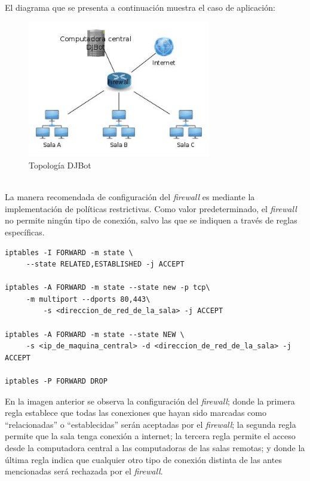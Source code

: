 \documentclass[a4paper,12pt]{article}
\begin{document}
El diagrama que se presenta a continuación muestra el caso de aplicación:\\
\newpage

\begin{figure}[htb]
\centering
\includegraphics[width=8cm]{./img/djbot-topologia.jpg}
\caption{Topología DJBot}
\end{figure}\\


La manera recomendada de configuración del \emph{firewall} es mediante la implementación de políticas restrictivas. Como valor predeterminado, el \emph{firewall} no permite ningún tipo de conexión, salvo las que se indiquen a través de reglas específicas.\\

\begin{verbatim}
iptables -I FORWARD -m state \
	 --state RELATED,ESTABLISHED -j ACCEPT

iptables -A FORWARD -m state --state new -p tcp\
	 -m multiport --dports 80,443\
         -s <direccion_de_red_de_la_sala> -j ACCEPT

iptables -A FORWARD -m state --state NEW \
	 -s <ip_de_maquina_central> -d <direccion_de_red_de_la_sala> -j ACCEPT

iptables -P FORWARD DROP
\end{verbatim}
\captionof{figure}{Firewall en router}


En la imagen anterior se observa la configuración del \emph{firewall}; donde la primera regla establece que todas las conexiones que hayan sido marcadas como “relacionadas” o “establecidas” serán aceptadas por el \emph{firewall}; la segunda regla permite que la sala tenga conexión a internet; la tercera regla permite el acceso desde la computadora central a las computadoras de las salas remotas; y donde la última regla indica que cualquier otro tipo de conexión distinta de las antes mencionadas será rechazada por el \emph{firewall}.\\
\end{document}
